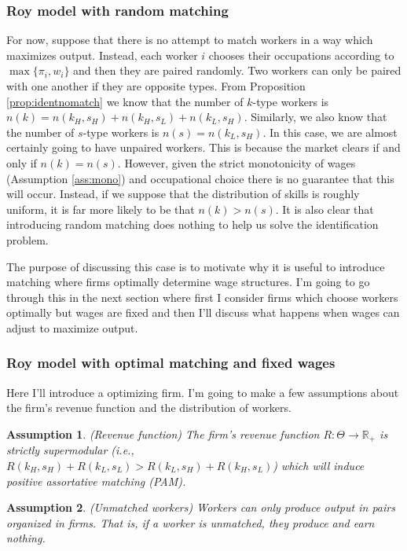 \documentclass[12 pt]{article}
\newtheorem{assumption}{Assumption} %
\begin{document}
\subsubsection{Roy model with random matching}

For now, suppose that there is no attempt to match workers in a way which maximizes output. Instead, each worker $i$ chooses their occupations according to $\max\{\pi_i,w_i\}$ and then they are paired randomly. Two workers can only be paired with one another if they are opposite types. From Proposition \ref{prop:identnomatch} we know that the number of $k$-type workers is $n(k) = n(k_H,s_H) + n(k_H,s_L) + n(k_L,s_H)$. Similarly, we also know that the number of $s$-type workers is $n(s)=n(k_L,s_H)$. In this case, we are almost certainly going to have unpaired workers. This is because the market clears if and only if $n(k) = n(s)$. However, given the strict monotonicity of wages (Assumption \ref{ass:mono}) and occupational choice there is no guarantee that this will occur. Instead, if we suppose that the distribution of skills is roughly uniform, it is far more likely to be that $n(k)>n(s)$. It is also clear that introducing random matching does nothing to help us solve the identification problem.

 The purpose of discussing this case is to motivate why it is useful to introduce matching where firms optimally determine wage structures. I'm going to go through this in the next section where first I consider firms which choose workers optimally but wages are fixed and then I'll discuss what happens when wages can adjust to maximize output.

\subsubsection{Roy model with optimal matching and fixed wages}

Here I'll introduce a optimizing firm. I'm going to make a few assumptions about the firm's revenue function and the distribution of workers.

\begin{assumption}(Revenue function)
	The firm's revenue function $R:\Theta\to\mathbb{R}_+$ is strictly supermodular (i.e., $R(k_H,s_H) + R(k_L,s_L) > R(k_L,s_H) + R(k_H,s_L)$) which will induce positive assortative matching (PAM). 
	\label{ass:rev}
\end{assumption}

\begin{assumption}(Unmatched workers)
	Workers can only produce output in pairs organized in firms. That is, if a worker is unmatched, they produce and earn nothing.
	\label{ass:unmatched}
\end{assumption}
\end{document}
